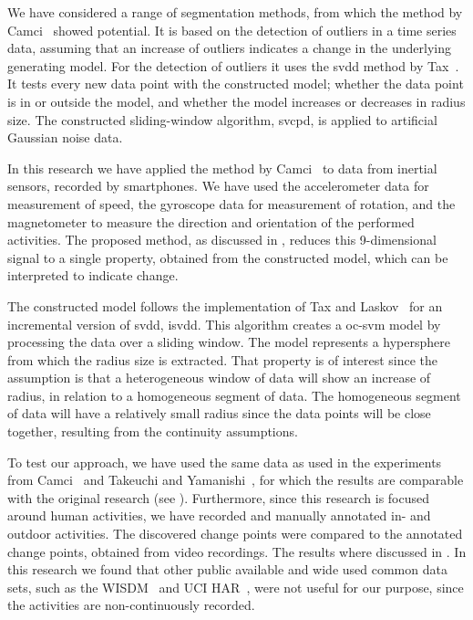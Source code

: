 We have considered a range of segmentation methods, from which the method by Camci~\cite{camci2010change} showed potential.
It is based on the detection of outliers in a time series data, assuming that an increase of outliers indicates a change in the underlying generating model.
For the detection of outliers it uses the \gls{svdd} method by Tax~\cite{tax1999support}.
It tests every new data point with the constructed model; whether the data point is in or outside the model, and whether the model increases or decreases in radius size.
The constructed sliding-window algorithm, \gls{svcpd}, is applied to artificial Gaussian noise data.

In this research we have applied the method by Camci~\cite{camci2010change} to data from inertial sensors, recorded by smartphones.
We have used the accelerometer data for measurement of speed, the gyroscope data for measurement of rotation, and the magnetometer to measure the direction and orientation of the performed activities.
The proposed method, as discussed in , reduces this 9-dimensional signal to a single property, obtained from the constructed model, which can be interpreted to indicate change.

The constructed model follows the implementation of Tax and Laskov~\cite{tax2003online} for an incremental version of \gls{svdd}, \gls{isvdd}.
This algorithm creates a \gls{oc-svm} model by processing the data over a sliding window.
The model represents a hypersphere from which the radius size is extracted.
That property is of interest since the assumption is that a heterogeneous window of data will show an increase of radius, in relation to a homogeneous segment of data.
The homogeneous segment of data will have a relatively small radius since the data points will be close together, resulting from the continuity assumptions.

To test our approach, we have used the same data as used in the experiments from Camci~\cite{camci2010change} and Takeuchi and Yamanishi~\cite{takeuchi2006unifying}, for which the results are comparable with the original research (see ).
Furthermore, since this research is focused around human activities, we have recorded and manually annotated in- and outdoor activities.
The discovered change points were compared to the annotated change points, obtained from video recordings.
The results where discussed in .
In this research we found that other public available and wide used common data sets, such as the WISDM~\cite{kwapisz2011activity} and UCI HAR~\cite{anguita2012human}, were not useful for our purpose, since the activities are non-continuously recorded.

